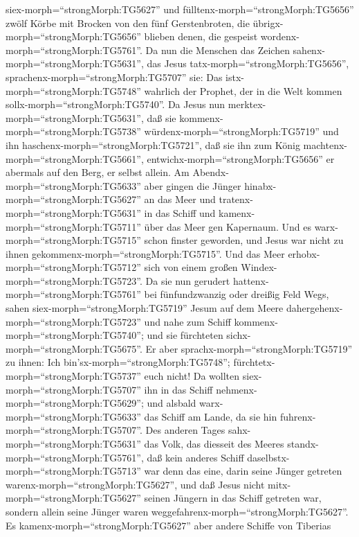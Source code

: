 siex-morph=``strongMorph:TG5627'' und
fülltenx-morph=``strongMorph:TG5656'' zwölf Körbe mit Brocken von den
fünf Gerstenbroten, die übrigx-morph=``strongMorph:TG5656'' blieben
denen, die gespeist wordenx-morph=``strongMorph:TG5761''. 
Da nun die Menschen das Zeichen sahenx-morph=``strongMorph:TG5631'', das
Jesus tatx-morph=``strongMorph:TG5656'',
sprachenx-morph=``strongMorph:TG5707'' sie: Das
istx-morph=``strongMorph:TG5748'' wahrlich der Prophet, der in die Welt
kommen sollx-morph=``strongMorph:TG5740''.  Da Jesus nun
merktex-morph=``strongMorph:TG5631'', daß sie
kommenx-morph=``strongMorph:TG5738''
würdenx-morph=``strongMorph:TG5719'' und ihn
haschenx-morph=``strongMorph:TG5721'', daß sie ihn zum König
machtenx-morph=``strongMorph:TG5661'',
entwichx-morph=``strongMorph:TG5656'' er abermals auf den Berg, er
selbst allein.  Am Abendx-morph=``strongMorph:TG5633'' aber
gingen die Jünger hinabx-morph=``strongMorph:TG5627'' an das Meer
 und tratenx-morph=``strongMorph:TG5631'' in das Schiff und
kamenx-morph=``strongMorph:TG5711'' über das Meer gen Kapernaum. Und es
warx-morph=``strongMorph:TG5715'' schon finster geworden, und Jesus war
nicht zu ihnen gekommenx-morph=``strongMorph:TG5715''.  Und
das Meer erhobx-morph=``strongMorph:TG5712'' sich von einem großen
Windex-morph=``strongMorph:TG5723''.  Da sie nun gerudert
hattenx-morph=``strongMorph:TG5761'' bei fünfundzwanzig oder dreißig
Feld Wegs, sahen siex-morph=``strongMorph:TG5719'' Jesum auf dem Meere
dahergehenx-morph=``strongMorph:TG5723'' und nahe zum Schiff
kommenx-morph=``strongMorph:TG5740''; und sie fürchteten
sichx-morph=``strongMorph:TG5675''.  Er aber
sprachx-morph=``strongMorph:TG5719'' zu ihnen: Ich
bin'sx-morph=``strongMorph:TG5748'';
fürchtetx-morph=``strongMorph:TG5737'' euch nicht!  Da
wollten siex-morph=``strongMorph:TG5707'' ihn in das Schiff
nehmenx-morph=``strongMorph:TG5629''; und alsbald
warx-morph=``strongMorph:TG5633'' das Schiff am Lande, da sie hin
fuhrenx-morph=``strongMorph:TG5707''.  Des anderen Tages
sahx-morph=``strongMorph:TG5631'' das Volk, das diesseit des Meeres
standx-morph=``strongMorph:TG5761'', daß kein anderes Schiff
daselbstx-morph=``strongMorph:TG5713'' war denn das eine, darin seine
Jünger getreten warenx-morph=``strongMorph:TG5627'', und daß Jesus nicht
mitx-morph=``strongMorph:TG5627'' seinen Jüngern in das Schiff getreten
war, sondern allein seine Jünger waren
weggefahrenx-morph=``strongMorph:TG5627''.  Es
kamenx-morph=``strongMorph:TG5627'' aber andere Schiffe von Tiberias
